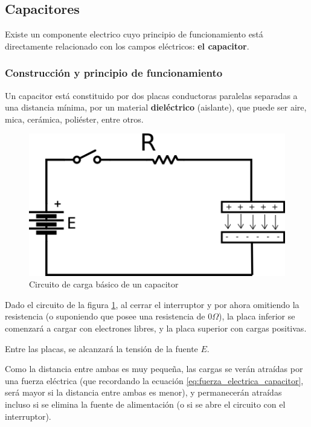 \subsection{Capacitores}

Existe un componente electrico cuyo principio de funcionamiento está directamente relacionado con los campos eléctricos: \textbf{el capacitor}.

\subsubsection{Construcción y principio de funcionamiento}

Un capacitor está constituido por dos placas conductoras paralelas separadas a una distancia mínima, por un material \textbf{dieléctrico} (aislante), que puede ser aire, mica, cerámica, poliéster, entre otros.

\begin{figure}[htbp]
  \includegraphics[scale=1]{images/capacitor_circuito_carga}
  \caption{Circuito de carga básico de un capacitor}
  \label{fig:cap_carga}
\end{figure}

Dado el circuito de la figura \ref{fig:cap_carga}, al cerrar el interruptor y por ahora omitiendo la resistencia (o suponiendo que posee una resistencia de $0 \Omega$), la placa inferior se comenzará a cargar con electrones libres, y la placa superior con cargas positivas.

Entre las placas, se alcanzará la tensión de la fuente $E$.

Como la distancia entre ambas es muy pequeña, las cargas se verán atraídas por una fuerza eléctrica (que recordando la ecuación \ref{eq:fuerza_electrica_capacitor}, será mayor si la distancia entre ambas es menor), y permanecerán atraídas incluso si se elimina la fuente de alimentación (o si se abre el circuito con el interruptor).


